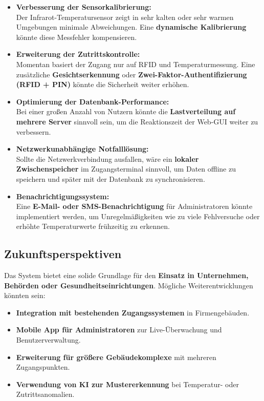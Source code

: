 \begin{itemize}
    \item \textbf{Verbesserung der Sensorkalibrierung:}\\
    Der Infrarot-Temperatursensor zeigt in sehr kalten oder sehr warmen Umgebungen minimale Abweichungen. Eine \textbf{dynamische Kalibrierung} könnte diese Messfehler kompensieren.
    \item \textbf{Erweiterung der Zutrittskontrolle:}\\
    Momentan basiert der Zugang nur auf RFID und Temperaturmessung. Eine zusätzliche \textbf{Gesichtserkennung} oder \textbf{Zwei-Faktor-Authentifizierung (RFID + PIN)} könnte die Sicherheit weiter erhöhen.
    \item \textbf{Optimierung der Datenbank-Performance:}\\
    Bei einer großen Anzahl von Nutzern könnte die \textbf{Lastverteilung auf mehrere Server} sinnvoll sein, um die Reaktionszeit der Web-GUI weiter zu verbessern.
    \item \textbf{Netzwerkunabhängige Notfalllösung:}\\
    Sollte die Netzwerkverbindung ausfallen, wäre ein \textbf{lokaler Zwischenspeicher} im Zugangsterminal sinnvoll, um Daten offline zu speichern und später mit der Datenbank zu synchronisieren.
    \item \textbf{Benachrichtigungssystem:}\\
    Eine \textbf{E-Mail- oder SMS-Benachrichtigung} für Administratoren könnte implementiert werden, um Unregelmäßigkeiten wie zu viele Fehlversuche oder erhöhte Temperaturwerte frühzeitig zu erkennen.
\end{itemize}

\subsection{Zukunftsperspektiven}

Das System bietet eine solide Grundlage für den \textbf{Einsatz in Unternehmen, Behörden oder Gesundheitseinrichtungen}. Mögliche Wei\-ter\-ent\-wick\-lung\-en könnten sein:

\begin{itemize}
    \item \textbf{Integration mit bestehenden Zugangssystemen} in Firmengebäuden.
    \item \textbf{Mobile App für Administratoren} zur Live-Überwachung und Benutzerverwaltung.
    \item \textbf{Erweiterung für größere Gebäudekomplexe} mit mehreren Zugangspunkten.
    \item \textbf{Verwendung von KI zur Mustererkennung} bei Temperatur- oder Zutrittsanomalien.
\end{itemize}

